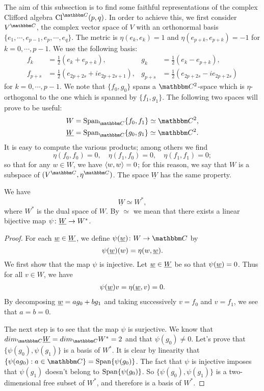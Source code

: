 The aim of this subsection is to find some faithful representations of the complex Clifford algebra $\Cliff^{\eC}(p,q)$. In order to achieve this, we first consider $V^{\eC}$, the complex vector space of $V$ with an orthonormal basis $\{ e_1,\cdots,e_{p-1},e_p,\cdots,e_q  \}$. The metric is $\eta(e_k,e_k)=1$ and $\eta(e_{p+k},e_{p+k})=-1$ for $k=0,\cdots,p-1$. We use the following basis:
\begin{align}
f_k&=\frac{1}{2}(e_k+e_{p+k}),& g_k&=\frac{1}{2}(e_k-e_{p+k}),\\
 f_{p+s}&=\frac{1}{2}(e_{2p+2s}+ie_{2p+2s+1}),& g_{p+s}&=\frac{1}{2}(e_{2p+2s}-ie_{2p+2s})
\end{align}
for $k=0,\cdots,p-1$.
We note that $\{f_0,g_0\}$ spans a $\eC^2$-space which is $\eta$-orthogonal to the one which is spanned by $\{f_1,g_1\}$. The following two  spaces will prove to be useful:
\begin{subequations}
\begin{align}
  W           &=\Span_{\eC}\{f_0,f_1\}\simeq\eC^2,\\
 \underline{W}&=\Span_{\eC}\{g_0,g_1\}\simeq\eC^2.
\end{align}
\end{subequations}
It is easy to compute the various products; among others we find
\begin{equation}
 \eta(f_0,f_0)=0,\quad
 \eta(f_1,f_0)=0,\quad
  \eta(f_1,f_1)=0;
\end{equation}
so that for any $w\in W$, we have $\langle w,w\rangle=0$; for this reason, we say that $W$ is a  subspace of $(V^{\eC},\eta^{\eC})$. The space $\underline{W}$ has the same property.

\begin{proposition}
We have
\begin{equation}
  \underline{W}\simeq W^*,
\end{equation}
where $W^*$ is the dual space of $W$. By $\simeq$ we mean that there exists a linear bijective map $\psi\colon \underline{W}\to W^*$.
\end{proposition}
\begin{proof}
For each $\underline{w}\in\underline{W}$, we define $\dpt{\psi(\uw)}{W}{\eC}$ by
\[
   \psi(\underline{w})(w)=\eta(w,\underline{w}).
\]
We first show that the map $\psi$ is injective. Let $\underline{w}\in\underline{W}$ be so that $\psi(\underline{w})=0$. Thus for all $v\in W$, we have
\begin{eqnarray}
   \label{3101r1}\psi(\underline{w})v=\eta(\underline{w},v)=0.
\end{eqnarray}
By decomposing $\underline{w}=ag_0+bg_1$ and taking successively $v=f_0$ and $v=f_1$, we see that $a=b=0$.

The next step is to see that the map $\psi$ is surjective. We know that $dim_{\eC}\uW=dim_{\eC}W^*=2$ and that $\psi(g_0)\neq 0$. Let's prove that $\{\psi(g_0),\psi(g_1)\}$ is a basis of $W^*$. It is clear by linearity that $\{\psi(ag_0):a\in\eC\}=\Span\{\psi(g_0)\}$. The fact that $\psi$ is injective  imposes that $\psi(g_1)$ doesn't belong to $\operatorname{Span}\{\psi(g_0)\}$. So $\{\psi(g_0),\psi(g_1)\}$ is a two-dimensional free subset of $W^*$, and therefore is a basis of $W^*$.
\end{proof}

